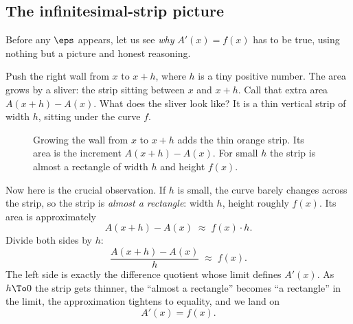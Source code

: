 \subsection{The infinitesimal-strip picture}

Before any $\eps$ appears, let us see \emph{why} $A'(x)=f(x)$ has to be true,
using nothing but a picture and honest reasoning.

Push the right wall from $x$ to $x+h$, where $h$ is a tiny positive number. The
area grows by a sliver: the strip sitting between $x$ and $x+h$. Call that extra
area $A(x+h)-A(x)$. What does the sliver look like? It is a thin vertical strip
of width $h$, sitting under the curve $f$.

\begin{figure}[H]
\centering
{}
\caption{Growing the wall from $x$ to $x+h$ adds the thin orange strip. Its area
is the increment $A(x+h)-A(x)$. For small $h$ the strip is almost a rectangle of
width $h$ and height $f(x)$.}
\label{ch21:fig-strip}
\end{figure}

Now here is the crucial observation. If $h$ is small, the curve barely changes
across the strip, so the strip is \emph{almost a rectangle}: width $h$, height
roughly $f(x)$. Its area is approximately
\[
  A(x+h)-A(x) \;\approx\; f(x)\cdot h .
\]
Divide both sides by $h$:
\[
  \frac{A(x+h)-A(x)}{h} \;\approx\; f(x).
\]
The left side is exactly the difference quotient whose limit defines $A'(x)$. As
$h\To 0$ the strip gets thinner, the ``almost a rectangle'' becomes ``a
rectangle'' in the limit, the approximation tightens to equality, and we land on
\[
  A'(x) = f(x).
\]

